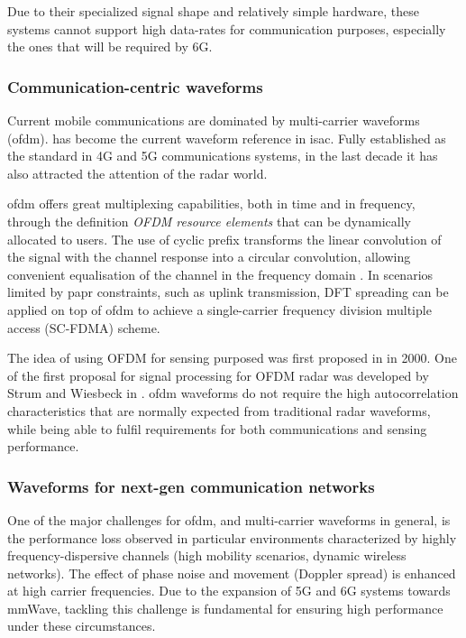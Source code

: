 	Due to their specialized signal shape and relatively simple hardware, these systems cannot support high data-rates for communication purposes, especially the ones that will be required by 6G.
	
	\subsubsection{Communication-centric waveforms}
	
	Current mobile communications are dominated by multi-carrier waveforms (\gls{ofdm}).
	 has become the current waveform reference in \gls{isac}. Fully established as the standard in 4G and 5G communications systems, in the last decade it has also attracted the attention of the radar world.
	
	\gls{ofdm} offers great multiplexing capabilities, both in time and in frequency, through the definition \textit{OFDM resource elements} that can be dynamically allocated to users. The use of cyclic prefix transforms the linear convolution of the signal with the channel response into a circular convolution, allowing convenient equalisation of the channel in the frequency domain \cite{Wild_Grudnitsky_Mandelli_Henninger_Guan_Schaich_2023}. In scenarios limited by \gls{papr} constraints, such as uplink transmission, DFT spreading can  be applied on top of \gls{ofdm} to achieve a single-carrier frequency division multiple access (SC-FDMA) scheme.
	
	The idea of using OFDM for sensing purposed was first proposed in \cite{Levanon_ofdm} in 2000. One of the first proposal for signal processing for OFDM radar was developed by Strum and Wiesbeck in \cite{Sturm_Wiesbeck_2011}.
	\gls{ofdm} waveforms do not require the high autocorrelation characteristics that are normally expected from traditional radar waveforms, while being able to fulfil requirements for both communications and sensing performance.
	
	\subsubsection{Waveforms for next-gen communication networks}
	
	One of the major challenges for \gls{ofdm}, and multi-carrier waveforms in general, is the performance loss observed in particular environments characterized by highly frequency-dispersive channels (\eg high mobility scenarios, dynamic wireless networks).
	The effect of phase noise and movement (Doppler spread) is enhanced at high carrier frequencies. 
	Due to the expansion of 5G and 6G systems towards mmWave, tackling this challenge is fundamental for ensuring high performance under these circumstances.
	
